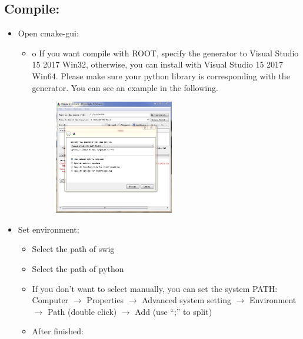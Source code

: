 \documentclass{article}
\begin{document}
    \subsection{Compile:}
        \begin{itemize}
            \item Open cmake-gui:
            
                \begin{itemize}
                    \item o	If you want compile with ROOT, specify the generator to Visual Studio 15 2017 Win32, otherwise, you can install with Visual Studio 15 2017 Win64. Please make sure your python library is corresponding with the generator. You can see an example in the following.
                    
                    \begin{figure}[h!]
                    \centering
                    \includegraphics[scale=1.7,height=5cm]{Figures/Cmake_1.jpg}
                    \end{figure}
                    
                \end{itemize}
            
            \item Set environment:
            
                \begin{itemize}
                
                    \item Select the path of swig
                    \item Select the path of python
                    \item If you don’t want to select manually, you can set the system PATH:\\
                    {\color{cyan} Computer $\to$ Properties $\to$ Advanced system setting $\to$ Environment $\to$ Path (double click) $\to$ Add (use “;” to split)}
                    \item After finished:
                    

\end{itemize}
\end{itemize}
\end{document}
